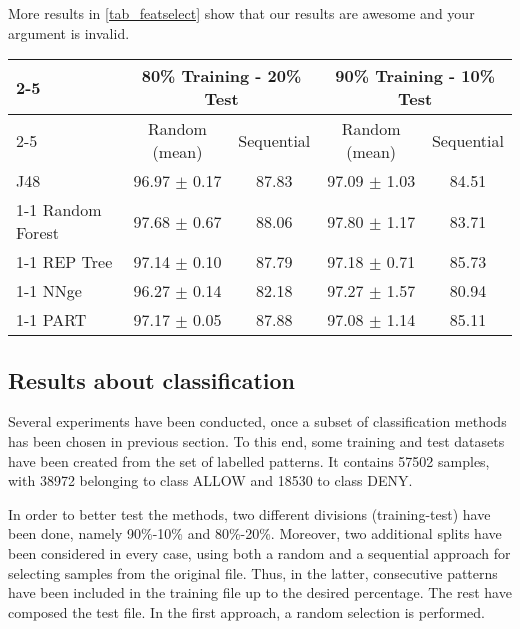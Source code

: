 \documentclass{llncs}
\begin{document}
More results in \ref{tab_featselect} show that our results are awesome and your argument is invalid.

\begin{table*}[htpb]
\centering
 \caption{\label{tab_featselect} Percentage of correctly classified patterns for non-balanced data}
{\small
\begin{tabular}{|l|c|c|c|c|}
\cline{2-5}
\multicolumn{1}{l|}{} & \multicolumn{2}{c|}{80\% Training - 20\% Test} & \multicolumn{2}{c|}{90\% Training - 10\% Test} \\ 
\cline{2-5}
\multicolumn{1}{l|}{} & Random (mean) & Sequential & Random (mean) & Sequential \\ 
\hline
J48 & 96.97 $\pm$ 0.17 & 87.83 & 97.09 $\pm$ 1.03 & 84.51 \\ 
\cline{1-1}
Random Forest & 97.68 $\pm$ 0.67 & 88.06 & 97.80 $\pm$ 1.17 & 83.71 \\ 
\cline{1-1}
REP Tree & 97.14 $\pm$ 0.10 & 87.79 & 97.18 $\pm$ 0.71 & 85.73 \\ 
\cline{1-1}
NNge & 96.27 $\pm$ 0.14 & 82.18 & 97.27 $\pm$ 1.57 & 80.94 \\ 
\cline{1-1}
PART & 97.17 $\pm$ 0.05 & 87.88 & 97.08 $\pm$ 1.14 & 85.11 \\ 
\hline
\end{tabular}
}
\end{table*}

\subsection{Results about classification}

\noindent Several experiments have been conducted, once a subset of classification methods has been chosen in previous section.
To this end, some training and test datasets have been created from
the set of labelled patterns. It contains 57502 samples, with 38972
belonging to class ALLOW and 18530 to class DENY.

In order to better test the methods, two different divisions (training-test) have been done, namely 90\%-10\% and 80\%-20\%. Moreover, two additional splits have been considered in every case, using both a random and a sequential approach for selecting samples from the original file. Thus, in the latter, consecutive patterns have been included in the training file up to the desired percentage. The rest have composed the test file. In the first approach, a random selection is performed.
\end{document}
